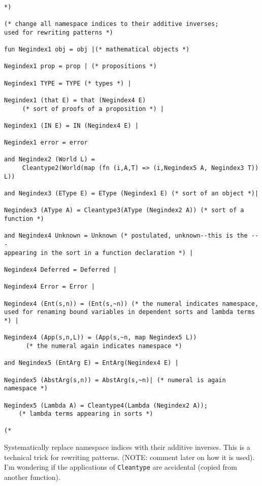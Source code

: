 \documentclass{article}
\begin{document}
\begin{verbatim}

*)

(* change all namespace indices to their additive inverses;  
used for rewriting patterns *)

fun Negindex1 obj = obj |(* mathematical objects *) 

Negindex1 prop = prop | (* propositions *) 

Negindex1 TYPE = TYPE (* types *) |

Negindex1 (that E) = that (Negindex4 E)  
     (* sort of proofs of a proposition *) |

Negindex1 (IN E) = IN (Negindex4 E) |

Negindex1 error = error

and Negindex2 (World L) = 
     Cleantype2(World(map (fn (i,A,T) => (i,Negindex5 A, Negindex3 T)) L))

and Negindex3 (EType E) = EType (Negindex1 E) (* sort of an object *)|

Negindex3 (AType A) = Cleantype3(AType (Negindex2 A)) (* sort of a function *)

and Negindex4 Unknown = Unknown (* postulated, unknown--this is the --- 
appearing in the sort in a function declaration *) |

Negindex4 Deferred = Deferred |

Negindex4 Error = Error |

Negindex4 (Ent(s,n)) = (Ent(s,~n)) (* the numeral indicates namespace, 
used for renaming bound variables in dependent sorts and lambda terms *) |

Negindex4 (App(s,n,L)) = (App(s,~n, map Negindex5 L)) 
      (* the numeral again indicates namespace *)

and Negindex5 (EntArg E) = EntArg(Negindex4 E) |

Negindex5 (AbstArg(s,n)) = AbstArg(s,~n)| (* numeral is again namespace *)

Negindex5 (Lambda A) = Cleantype4(Lambda (Negindex2 A));  
    (* lambda terms appearing in sorts *)

(*

\end{verbatim}

Systematically replace namespace indices with their additive inverses.  This is a technical trick for rewriting
patterns.  (NOTE:  comment later on how it is used).  I'm wondering if the applications of {\tt Cleantype} are accidental (copied from another function).
\end{document}
